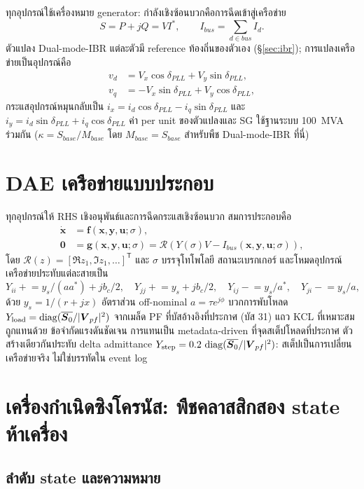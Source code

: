 \documentclass[12pt,a4paper]{article}
\newcommand{\vect}[1]{\boldsymbol{#1}}
\begin{document}
ทุกอุปกรณ์ใช้เครื่องหมาย generator: กำลังเชิงซ้อนบวกคือการฉีดเข้าสู่เครือข่าย
\[
S=P+jQ=V I^*,\qquad I_{bus}=\sum_{d\in bus} I_d.
\]
ตัวแปลง Dual-mode-IBR แต่ละตัวมี reference ท้องถิ่นของตัวเอง (\S\ref{sec:ibr});
การแปลงเครือข่ายเป็นอุปกรณ์คือ
\begin{align}
v_d&=V_x\cos\delta_{PLL}+V_y\sin\delta_{PLL},\\
v_q&=-V_x\sin\delta_{PLL}+V_y\cos\delta_{PLL},
\end{align}
กระแสอุปกรณ์หมุนกลับเป็น
$i_x=i_d\cos\delta_{PLL}-i_q\sin\delta_{PLL}$ และ
$i_y=i_d\sin\delta_{PLL}+i_q\cos\delta_{PLL}$ ค่า per unit ของตัวแปลงและ SG
ใช้ฐานระบบ 100~MVA ร่วมกัน ($\kappa=S_{base}/M_{base}$ โดย
$M_{base}=S_{base}$ สำหรับพืช Dual-mode-IBR ที่นี่)

\section{DAE เครือข่ายแบบประกอบ}

ทุกอุปกรณ์ให้ RHS เชิงอนุพันธ์และการฉีดกระแสเชิงซ้อนบวก สมการประกอบคือ
\begin{align}
\dot{\vect x}&=\vect f(\vect x,\vect y,\vect u;\sigma),\\
\vect 0&=\vect g(\vect x,\vect y,\vect u;\sigma)
          =\mathcal R\!\left(Y(\sigma)V-I_{bus}(\vect x,\vect y,\vect u;\sigma)\right),
\end{align}
โดย $\mathcal R(z)=[\Re z_1,\Im z_1,\ldots]^{\mathsf T}$ และ $\sigma$
บรรจุโทโพโลยี สถานะเบรกเกอร์ และโหมดอุปกรณ์ เครือข่ายประทับแต่ละสายเป็น
\[
Y_{ii}\mathrel{+}=y_s/(a a^*)+jb_c/2,\quad
Y_{jj}\mathrel{+}=y_s+jb_c/2,\quad
Y_{ij}\mathrel{-}=y_s/a^*,\quad
Y_{ji}\mathrel{-}=y_s/a,
\]
ด้วย $y_s=1/(r+jx)$ อัตราส่วน off-nominal $a=\tau e^{j\phi}$
บวกการพับโหลด $Y_{\rm load}=\operatorname{diag}(\overline{\vect S_0}/|\vect V_{pf}|^2)$
จากเมล็ด PF ที่บัสอ้างอิงที่ประกาศ (บัส 31) แถว KCL ที่เหมาะสมถูกแทนด้วย
ข้อจำกัดแรงดันชัดเจน การแทนเป็น metadata-driven ที่จุดสเต็ปโหลดที่ประกาศ
ตัวสร้างเดียวกันประทับ delta admittance
$Y_{\rm step}=0.2\,\operatorname{diag}(\overline{\vect S_0}/|\vect V_{pf}|^2)$:
สเต็ปเป็นการเปลี่ยนเครือข่ายจริง ไม่ใช่บรรทัดใน event log

\section{เครื่องกำเนิดซิงโครนัส: พืชคลาสสิกสอง state ห้าเครื่อง}

\subsection{ลำดับ state และความหมาย}
\end{document}
